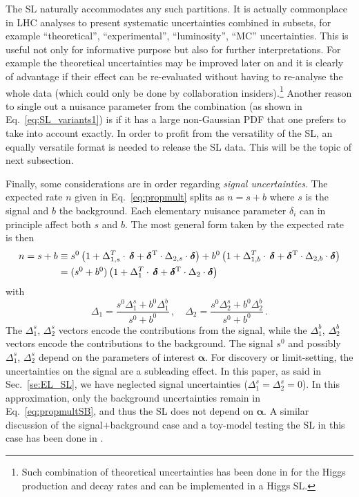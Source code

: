 \documentclass[11pt]{article}
\newcommand{\be}{\begin{equation}}
\newcommand{\ee}{\end{equation}}
\begin{document}
The SL naturally accommodates any such partitions. It is actually  commonplace in LHC analyses   to present systematic uncertainties combined in subsets, for example ``theoretical'', ``experimental'', ``luminosity'', ``MC'' uncertainties. 
This is useful not only for informative purpose but also for further interpretations. 
For example the theoretical uncertainties may be improved later on 
and it is clearly of advantage if their effect can be re-evaluated without having to re-analyse the whole data (which could only be done by collaboration insiders).\footnote{Such combination of theoretical uncertainties  has been done in \cite{Arbey:2016kqi}  for the Higgs production and decay rates and can be implemented in a Higgs SL.}
Another reason to single out a nuisance parameter  from the combination (as shown in Eq.~\eqref{eq:SL_variants1})
is if it has a large non-Gaussian PDF that one prefers to take into account exactly.
In order to profit from the  versatility of the SL, an equally  versatile format is needed to release the SL data. This will be the topic of next subsection.

Finally, some considerations are in order regarding  \textit{signal uncertainties}. 
The expected rate $n$ given in Eq.~\eqref{eq:propmult} splits as $n=s+b$ where $s$ is the signal and $b$ the background. 
Each elementary nuisance parameter $\delta_i$ can in principle affect both $s$ and $b$. 
The most general form taken by the expected rate is then
\begin{align} n=s+b & \equiv s^{0} \left( 1+ \Delta_{1,s}^T\cdot \, \boldsymbol{\delta}+\boldsymbol{\delta}^{\rm T}\cdot\Delta_{2,s} \cdot \boldsymbol{\delta} \right) \nonumber
+ b^{0} \left( 1+ \Delta_{1,b}^T\cdot \, \boldsymbol{\delta}+\boldsymbol{\delta}^{\rm T}\cdot\Delta_{2,b} \cdot \boldsymbol{\delta} \right) \\
 & = (s^{0}+b^0) \left( 1+ \Delta_{1}^T\cdot \, \boldsymbol{\delta}+\boldsymbol{\delta}^{\rm T}\cdot\Delta_{2} \cdot \boldsymbol{\delta} \right)\,
\label{eq:propmultSB}
\end{align}
with
\be
\Delta_{1}= \frac{s^{0}\Delta_{1}^s+b^0 \Delta_{1}^b}{s^{0}+b^0}\,,\quad
\Delta_{2}= \frac{s^{0}\Delta_{2}^s+b^0 \Delta_{2}^b}{s^{0}+b^0}\,.
\label{eq:Deltas}
\ee
The $\Delta^s_{1}$, $\Delta^s_{2}$ vectors encode the contributions from the signal, while the $\Delta^b_{1}$, $\Delta^b_{2}$ vectors encode the contributions to the background. 
The signal $s^{0}$ and possibly $\Delta^s_{1}$, $\Delta^s_{2}$ depend on the parameters of interest ${\bm \alpha}$. 
For discovery or limit-setting, the uncertainties on the signal are a subleading effect. In this paper, as said in Sec.~\ref{se:EL_SL}, 
we have neglected signal uncertainties ($\Delta_{1}^s=\Delta_{2}^s=0$).
In this approximation, only the background uncertainties remain in Eq.~\eqref{eq:propmultSB}, 
and thus the SL does not depend on ${\bm \alpha}$. 
A similar discussion of the signal$+$background case and a toy-model testing the SL in this case has been done in \cite{Fichet:2016gvx}. 
\end{document}
